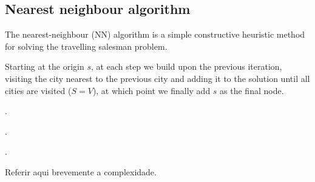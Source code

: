 \subsection{Nearest neighbour algorithm} \label{algorithm-tsp-nn}
The nearest-neighbour (NN) algorithm is a simple constructive heuristic method for solving the travelling salesman problem.\par
Starting at the origin $s$, at each step we build upon the previous iteration, visiting the city nearest to the previous city and adding it to the solution until all cities are visited ($S = V$), at which point we finally add $s$ as the final node.\par
\par.\par.\par.\par Referir aqui brevemente a complexidade.
\vspace{-1em}
